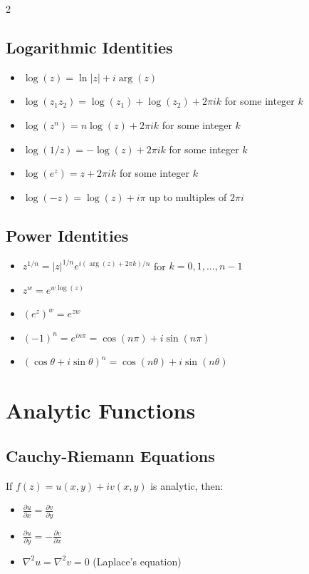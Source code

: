 \begin{multicols}{2}
\subsection*{Logarithmic Identities}
\begin{itemize}
\item $\log(z) = \ln|z| + i\arg(z)$
\item $\log(z_1 z_2) = \log(z_1) + \log(z_2) + 2\pi i k$ for some integer $k$
\item $\log(z^n) = n\log(z) + 2\pi i k$ for some integer $k$
\item $\log(1/z) = -\log(z) + 2\pi i k$ for some integer $k$
\item $\log(e^z) = z + 2\pi i k$ for some integer $k$
\item $\log(-z) = \log(z) + i\pi$ up to multiples of $2\pi i$
\end{itemize}
\subsection*{Power Identities}
\begin{itemize}
\item $z^{1/n} = |z|^{1/n} e^{i(\arg(z) + 2\pi k)/n}$ for $k = 0,1,...,n-1$
\item $z^{w} = e^{w\log(z)}$
\item $(e^z)^w = e^{zw}$
\item $(-1)^n = e^{in\pi} = \cos(n\pi) + i\sin(n\pi)$
\item $(\cos\theta + i\sin\theta)^n = \cos(n\theta) + i\sin(n\theta)$

\end{itemize}
\section*{Analytic Functions} 
\subsection*{Cauchy-Riemann Equations}
If $f(z) = u(x,y) + iv(x,y)$ is analytic, then:
\begin{itemize}
\item $\frac{\partial u}{\partial x} = \frac{\partial v}{\partial y}$
\item $\frac{\partial u}{\partial y} = -\frac{\partial v}{\partial x}$
\item $\nabla^2 u = \nabla^2 v = 0$ (Laplace's equation)
\end{itemize}


\end{multicols}
